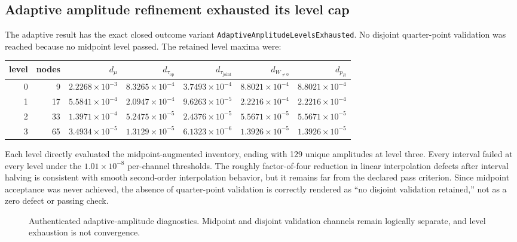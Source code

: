 \subsection{Adaptive amplitude refinement exhausted its level cap}

The adaptive result has the exact closed outcome variant
\texttt{AdaptiveAmplitudeLevelsExhausted}.  No disjoint
quarter-point validation was reached because no midpoint level passed.  The retained
level maxima were:
\begin{center}
\scriptsize
\begin{tabular}{@{}rrrrrrr@{}}
\toprule
level & nodes & $d_\mu$ & $d_{\tau_{\mathrm{op}}}$ & $d_{\tau_{\mathrm{joint}}}$ &
$d_{W_{\ne0}}$ & $d_{p_R}$\\
\midrule
0 & 9  & $2.2268\!\times10^{-3}$ & $8.3265\!\times10^{-4}$ & $3.7493\!\times10^{-4}$ & $8.8021\!\times10^{-4}$ & $8.8021\!\times10^{-4}$\\
1 & 17 & $5.5841\!\times10^{-4}$ & $2.0947\!\times10^{-4}$ & $9.6263\!\times10^{-5}$ & $2.2216\!\times10^{-4}$ & $2.2216\!\times10^{-4}$\\
2 & 33 & $1.3971\!\times10^{-4}$ & $5.2475\!\times10^{-5}$ & $2.4376\!\times10^{-5}$ & $5.5671\!\times10^{-5}$ & $5.5671\!\times10^{-5}$\\
3 & 65 & $3.4934\!\times10^{-5}$ & $1.3129\!\times10^{-5}$ & $6.1323\!\times10^{-6}$ & $1.3926\!\times10^{-5}$ & $1.3926\!\times10^{-5}$\\
\bottomrule
\end{tabular}
\end{center}
Each level directly evaluated the midpoint-augmented inventory, ending with 129 unique
amplitudes at level three.  Every interval failed at every level under the
$1.01\times10^{-8}$ per-channel thresholds.  The roughly factor-of-four reduction in
linear interpolation defects after interval halving is consistent with smooth
second-order interpolation behavior, but it remains far from the declared pass
criterion.  Since midpoint acceptance was never achieved, the absence of quarter-point
validation is correctly rendered as ``no disjoint validation retained,'' not as a zero
defect or passing check.

\begin{figure}[htbp]
 \centering
 \caption{Authenticated adaptive-amplitude diagnostics.  Midpoint and disjoint
 validation channels remain logically separate, and level exhaustion is not convergence.}
\end{figure}

